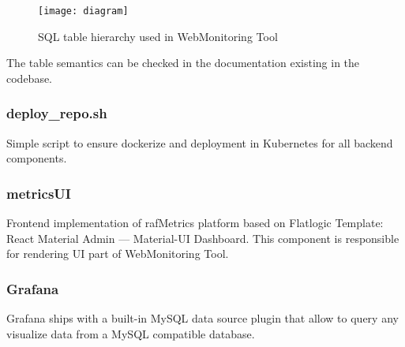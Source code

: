 \begin{figure}[H]
    \centering
    \texttt{[image: diagram]}
    \caption{SQL table hierarchy used in WebMonitoring Tool}
\end{figure}

The table semantics can be checked in the documentation existing in the codebase.

\subsubsection{deploy\_repo.sh}
Simple script to ensure dockerize and deployment in Kubernetes for all backend components.

\subsubsection{metricsUI}
Frontend implementation of rafMetrics platform based on Flatlogic Template: React Material Admin — Material-UI Dashboard. This component is responsible for rendering UI part of WebMonitoring Tool.

\subsubsection{Grafana}
Grafana ships with a built-in MySQL data source plugin that allow to query any visualize data from a MySQL compatible database.